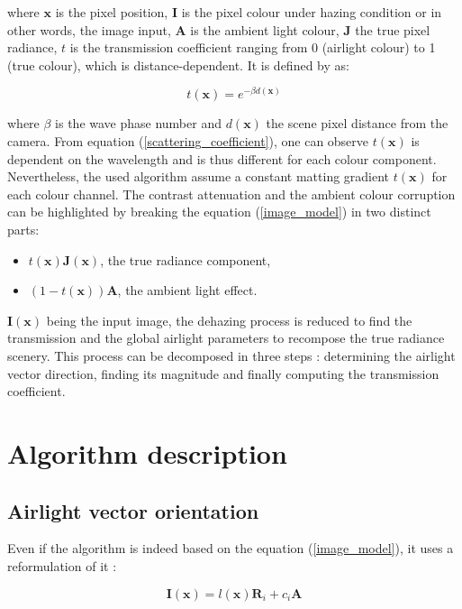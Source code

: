 \documentclass[conference]{IEEEtran}
\begin{document}
where $\mathbf{x}$ is the pixel position, $\mathbf{I}$ is the pixel colour under hazing condition or in other words, the image input, $\mathbf{A}$ is the ambient light colour,
$\mathbf{J}$ the true pixel radiance, $t$ is the transmission coefficient ranging from 0 (airlight colour)
to 1 (true colour), which is distance-dependent. It is defined by \cite{dehaze} as:

\begin{equation}
\label{scattering_coefficient}
t(\mathbf{x}) = e^{-\beta d(\mathbf{x})}
\end{equation}

where $\beta$ is the wave phase number and $d(\textbf{x})$ the scene pixel distance from the camera.  From equation (\ref{scattering_coefficient}),
one can observe $t(\mathbf{x})$ is dependent on the wavelength and is thus different for each colour component.  Nevertheless, the used algorithm assume a constant matting gradient $t(\mathbf{x})$ for each colour channel.
The contrast attenuation and the ambient colour corruption can be highlighted by breaking the equation (\ref{image_model}) in two distinct parts: 
\begin{itemize}
    \item $t(\mathbf{x}) \mathbf{J}(\mathbf{x})$, the true radiance component,
    \item $(1-t(\mathbf{x})) \mathbf{A}$, the ambient light effect.
\end{itemize}
$\mathbf{I}(\mathbf{x})$ being the input image, the dehazing process is reduced to find the transmission and the global airlight parameters to recompose
the true radiance scenery.  This process can be decomposed in three steps : determining the airlight vector direction, finding its magnitude and finally computing the transmission coefficient.

\section{Algorithm description}
\subsection{Airlight vector orientation}  
\label{AmauryPart}

Even if the algorithm is indeed based on the equation (\ref{image_model}), it uses a reformulation of it \cite{airlight}:

\begin{equation}
\label{shading_coefficient}
\mathbf{I}(\mathbf{x}) = l(\mathbf{x}) \mathbf{R}_i + c_i \mathbf{A}
\end{equation}
\end{document}
